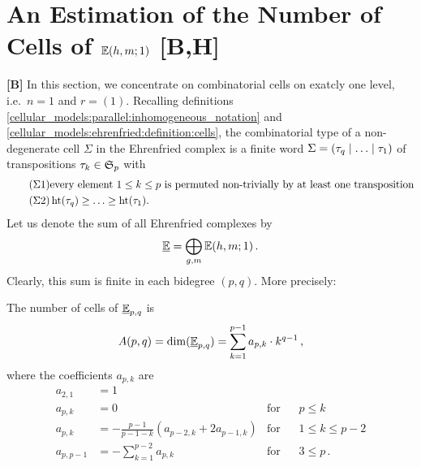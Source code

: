 \section{An Estimation of the Number of Cells of \texorpdfstring{$\E(h,m;1)$}{E(h,m;1)} [B,H]}
\label{complexity:number_of_mono_cells}
{\bf [B]} In this section, we concentrate on combinatorial cells on exatcly one level, i.e.\ $n = 1$ and $r = (1)$.
Recalling definitions \ref{cellular_models:parallel:inhomogeneous_notation} and \ref{cellular_models:ehrenfried:definition:cells},
the combinatorial type of a non-degenerate cell $\Sigma$ in the Ehrenfried complex is a finite word $\Sigma = \inhomq$ of transpositions $\tau_k \in \Symgrp_p$ with
\begin{align}
    \label{CharCellPerm} \tag{$\Sigma1$} & \text{every element $1 \le k \le p$ is permuted non-trivially by at least one transposition} \\
    \label{CharCellMono} \tag{$\Sigma2$} & \hgt(\tau_q) \ge \ldots \ge \hgt(\tau_1).
\end{align}
Let us denote the sum of all Ehrenfried complexes by
\[
    \ul\E = \bigoplus_{g,m} \Ehrr[1] \,.
\]
Clearly, this sum is finite in each bidegree $(p,q)$.
More precisely:
\begin{prop}
    \label{prop:number_of_mono_cells}
    The number of cells of $\ul\E_{p,q}$ is
    \begin{align}
        \label{Char_A_p_q} A(p,q) = \dim (\ul\E_{p,q}) = \sum_{k=1}^{p-1} a_{p,k} \cdot k^{q-1} \,,
    \end{align}
    where the coefficients $a_{p,k}$ are
    \begin{align}
        \label{Char_2_1} a_{2,1}         &= 1 \\
        \label{Char_p_leq_k}     a_{p,k} &= 0                                                    & \text{for} & \hspace{10pt} p \le k \\
        \label{Char_k_leq_p_2}   a_{p,k} &= -\frac{p-1}{p-1-k} ( a_{p-2,k} + 2a_{p-1,k} )        & \text{for} & \hspace{10pt} 1 \le k \le p-2 \\
        \label{Char_p_geq_3}   a_{p,p-1} &= - \sum_{k=1}^{p-2} a_{p,k}                           & \text{for} & \hspace{10pt} 3 \le p \,.
    \end{align}
\end{prop}

